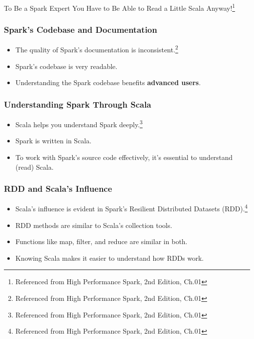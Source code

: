\begin{frame}
    \begin{center}
        \begin{tcolorbox}[colback=blue!5!white,colframe=blue!75!black,title=Attention!]
            To Be a Spark Expert You Have to Be Able to Read a Little Scala Anyway!\footnote{Referenced from High Performance Spark, 2nd Edition, Ch.01}
        \end{tcolorbox}
    \end{center}

\end{frame}

%
\begin{frame}
    \frametitle{Spark's Codebase and Documentation}
    \begin{itemize}
        \item The quality of Spark's documentation is inconsistent.\footnote{Referenced from High Performance Spark, 2nd Edition, Ch.01}  
        \item Spark's codebase is very readable.  
        \item Understanding the Spark codebase benefits \textbf{advanced users}.  
    \end{itemize}

\end{frame}

\begin{frame}
    \frametitle{Understanding Spark Through Scala}
    \begin{itemize}
        \item Scala helps you understand Spark deeply.\footnote{Referenced from High Performance Spark, 2nd Edition, Ch.01} 
        \item Spark is written in Scala. 
        \item To work with Spark's source code effectively, it's essential to understand (read) Scala. 
    \end{itemize}

\end{frame}

\begin{frame}
    \frametitle{RDD and Scala's Influence}
    \begin{itemize}
        \item Scala's influence is evident in Spark's Resilient Distributed Datasets (RDD).\footnote{Referenced from High Performance Spark, 2nd Edition, Ch.01} 
        \item RDD methods are similar to Scala's collection tools. 
        \item Functions like map, filter, and reduce are similar in both. 
        \item Knowing Scala makes it easier to understand how RDDs work. 
    \end{itemize}

\end{frame}

